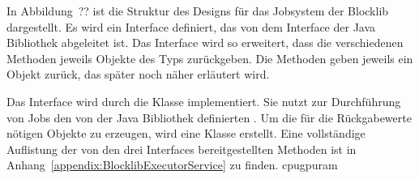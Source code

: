 \documentclass[12pt,a4paper,listof=totocnumbered,parskip=half]{scrartcl}
\begin{document}
In Abbildung~?? ist die Struktur des Designs für das Jobsystem der Blocklib dargestellt. Es wird ein Interface  definiert, das von dem Interface  der Java Bibliothek abgeleitet ist. Das Interface wird so erweitert, dass die verschiedenen  Methoden jeweils Objekte des Typs  zurückgeben. Die  Methoden geben jeweils ein  Objekt zurück, das später noch näher erläutert wird.

Das Interface  wird durch die Klasse  implementiert. Sie nutzt zur Durchführung von Jobs den von der Java Bibliothek definierten . Um die für die Rückgabewerte nötigen  Objekte zu erzeugen, wird eine Klasse  erstellt. Eine vollständige Auflistung der von den drei Interfaces bereitgestellten Methoden ist in Anhang~\vref{appendix:BlocklibExecutorService} zu finden. 
\pgfplotsset{
	height=4cm,
}
\si[]{\fps}\ac{cpu}\ac{gpu}\ac{ram}\\


\end{document}

